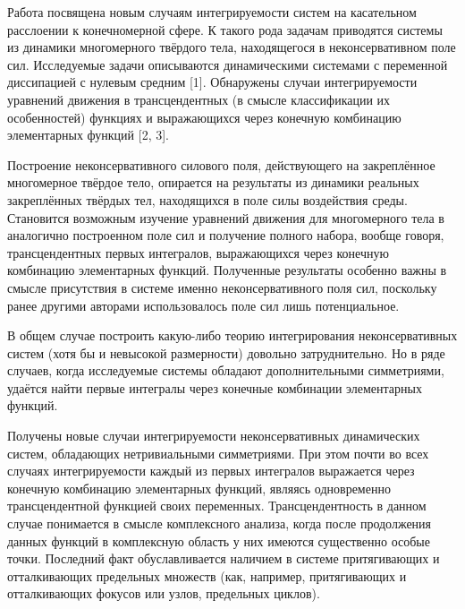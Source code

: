 


\vzmscaption

Работа посвящена новым случаям интегрируемости систем на касательном
расслоении к конечномерной сфере. К такого рода задачам приводятся
системы из динамики многомерного твёрдого тела, находящегося в
неконсервативном поле сил. Исследуемые задачи описываются
динамическими системами с переменной диссипацией с нулевым средним
[1]. Обнаружены случаи интегрируемости уравнений движения в
трансцендентных (в смысле классификации их особенностей) функциях и
выражающихся через конечную комбинацию элементарных функций [2, 3].

Построение неконсервативного силового поля, действующего на
закреплённое многомерное твёрдое тело, опирается на результаты из
динамики реальных закреплённых твёрдых тел, находящихся в поле силы
воздействия среды. Становится возможным изучение уравнений движения
для многомерного тела в аналогично построенном поле сил и получение
полного набора, вообще говоря, трансцендентных первых интегралов,
выражающихся через конечную комбинацию элементарных функций.
Полученные результаты особенно важны в смысле присутствия в системе
именно неконсервативного поля сил, поскольку ранее другими авторами
использовалось поле сил лишь потенциальное.



В общем случае построить какую-либо теорию интегрирования
неконсервативных систем (хотя бы и невысокой размерности) довольно
затруднительно. Но в ряде случаев, когда исследуемые системы
обладают дополнительными симметриями, удаётся найти первые интегралы
через конечные комбинации элементарных функций.

Получены новые случаи интегрируемости неконсервативных динамических
систем, обладающих нетривиальными симметриями. При этом почти во
всех случаях интегрируемости каждый из первых интегралов выражается
через конечную комбинацию элементарных функций, являясь одновременно
трансцендентной функцией своих переменных. Трансцендентность в
данном случае понимается в смысле комплексного анализа, когда после
продолжения данных функций в комплексную область у них имеются
существенно особые точки. Последний факт обуславливается наличием в
системе притягивающих и отталкивающих предельных множеств (как,
например, притягивающих и отталкивающих фокусов или узлов,
предельных циклов).



